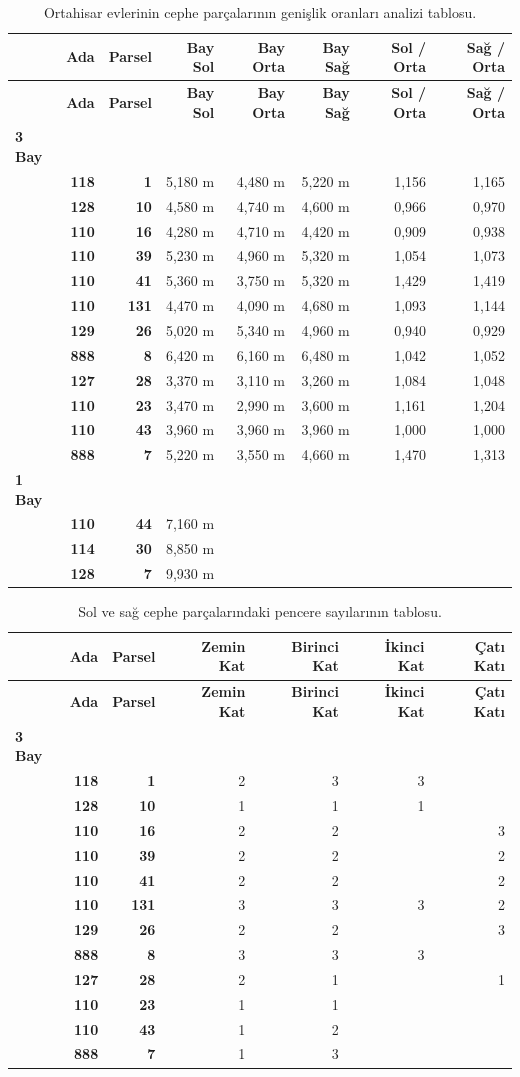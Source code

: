 \documentclass[12pt,turkish,a4paperpaper,]{report}
\begin{document}
\begin{longtable}[]{@{}lrrrrrrr@{}}
\caption{Ortahisar evlerinin cephe parçalarının genişlik oranları
analizi tablosu.}\tabularnewline
\toprule
& \textbf{Ada} & \textbf{Parsel} & \textbf{Bay Sol} & \textbf{Bay Orta}
& \textbf{Bay Sağ} & \textbf{Sol / Orta} & \textbf{Sağ /
Orta}\tabularnewline
\midrule
\endfirsthead
\toprule
& \textbf{Ada} & \textbf{Parsel} & \textbf{Bay Sol} & \textbf{Bay Orta}
& \textbf{Bay Sağ} & \textbf{Sol / Orta} & \textbf{Sağ /
Orta}\tabularnewline
\midrule
\endhead
\textbf{3 Bay} & & & & & & &\tabularnewline
& \textbf{118} & \textbf{1} & 5,180 m & 4,480 m & 5,220 m & 1,156 &
1,165\tabularnewline
& \textbf{128} & \textbf{10} & 4,580 m & 4,740 m & 4,600 m & 0,966 &
0,970\tabularnewline
& \textbf{110} & \textbf{16} & 4,280 m & 4,710 m & 4,420 m & 0,909 &
0,938\tabularnewline
& \textbf{110} & \textbf{39} & 5,230 m & 4,960 m & 5,320 m & 1,054 &
1,073\tabularnewline
& \textbf{110} & \textbf{41} & 5,360 m & 3,750 m & 5,320 m & 1,429 &
1,419\tabularnewline
& \textbf{110} & \textbf{131} & 4,470 m & 4,090 m & 4,680 m & 1,093 &
1,144\tabularnewline
& \textbf{129} & \textbf{26} & 5,020 m & 5,340 m & 4,960 m & 0,940 &
0,929\tabularnewline
& \textbf{888} & \textbf{8} & 6,420 m & 6,160 m & 6,480 m & 1,042 &
1,052\tabularnewline
& \textbf{127} & \textbf{28} & 3,370 m & 3,110 m & 3,260 m & 1,084 &
1,048\tabularnewline
& \textbf{110} & \textbf{23} & 3,470 m & 2,990 m & 3,600 m & 1,161 &
1,204\tabularnewline
& \textbf{110} & \textbf{43} & 3,960 m & 3,960 m & 3,960 m & 1,000 &
1,000\tabularnewline
& \textbf{888} & \textbf{7} & 5,220 m & 3,550 m & 4,660 m & 1,470 &
1,313\tabularnewline
\textbf{1 Bay} & & & & & & &\tabularnewline
& \textbf{110} & \textbf{44} & 7,160 m & & & &\tabularnewline
& \textbf{114} & \textbf{30} & 8,850 m & & & &\tabularnewline
& \textbf{128} & \textbf{7} & 9,930 m & & & &\tabularnewline
\bottomrule
\end{longtable}

\begin{longtable}[]{@{}lrrrrrr@{}}
\caption{Sol ve sağ cephe parçalarındaki pencere sayılarının
tablosu.}\tabularnewline
\toprule
& \textbf{Ada} & \textbf{Parsel} & \textbf{Zemin Kat} & \textbf{Birinci
Kat} & \textbf{İkinci Kat} & \textbf{Çatı Katı}\tabularnewline
\midrule
\endfirsthead
\toprule
& \textbf{Ada} & \textbf{Parsel} & \textbf{Zemin Kat} & \textbf{Birinci
Kat} & \textbf{İkinci Kat} & \textbf{Çatı Katı}\tabularnewline
\midrule
\endhead
\textbf{3 Bay} & & & & & &\tabularnewline
& \textbf{118} & \textbf{1} & 2 & 3 & 3 &\tabularnewline
& \textbf{128} & \textbf{10} & 1 & 1 & 1 &\tabularnewline
& \textbf{110} & \textbf{16} & 2 & 2 & & 3\tabularnewline
& \textbf{110} & \textbf{39} & 2 & 2 & & 2\tabularnewline
& \textbf{110} & \textbf{41} & 2 & 2 & & 2\tabularnewline
& \textbf{110} & \textbf{131} & 3 & 3 & 3 & 2\tabularnewline
& \textbf{129} & \textbf{26} & 2 & 2 & & 3\tabularnewline
& \textbf{888} & \textbf{8} & 3 & 3 & 3 &\tabularnewline
& \textbf{127} & \textbf{28} & 2 & 1 & & 1\tabularnewline
& \textbf{110} & \textbf{23} & 1 & 1 & &\tabularnewline
& \textbf{110} & \textbf{43} & 1 & 2 & &\tabularnewline
& \textbf{888} & \textbf{7} & 1 & 3 & &\tabularnewline
\bottomrule
\end{longtable}
\end{document}
